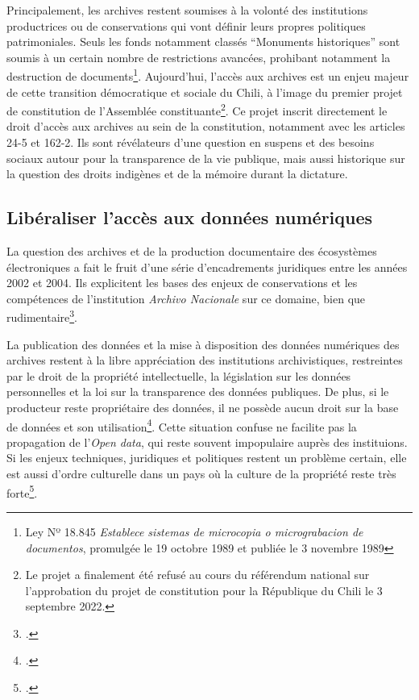 	Principalement, les archives restent soumises à la volonté des institutions productrices ou de conservations  qui vont définir leurs propres politiques patrimoniales. Seuls les fonds notamment classés \enquote{Monuments historiques} sont soumis à un certain nombre de restrictions avancées, prohibant notamment la destruction de documents\footnote{Ley Nº 18.845 \textit{Establece sistemas de microcopia o micrograbacion de documentos}, promulgée le 19 octobre 1989 et publiée le 3 novembre 1989}. Aujourd'hui, l'accès aux archives est un enjeu majeur de cette transition démocratique et sociale du Chili, à l'image du premier projet de constitution de l'Assemblée constituante\footnote{Le projet a finalement été refusé au cours du référendum national sur l'approbation du projet de constitution pour la République du Chili le 3 septembre 2022.}. Ce projet inscrit directement le droit d'accès aux archives au sein de la constitution, notamment avec les articles 24-5 et 162-2. Ils sont révélateurs d'une question en suspens et des besoins sociaux autour pour la transparence de la vie publique, mais aussi historique sur la question des droits indigènes et de la mémoire durant la dictature.
	
	\subsection{Libéraliser l'accès aux données numériques}
	
	La question des archives et de la production documentaire des écosystèmes électroniques a fait le fruit d'une série d'encadrements juridiques entre les années 2002 et 2004. Ils explicitent les bases des enjeux de conservations et les compétences de l'institution \textit{Archivo Nacionale} sur ce domaine, bien que rudimentaire\footcite{acevedoDocumentoElectronicoDerecho2004}. 
	
	La publication des données et la mise à disposition des données numériques des archives restent à la libre appréciation des institutions archivistiques, restreintes par le droit de la propriété intellectuelle, la législation sur les données personnelles et la loi sur la transparence des données publiques. De plus, si le producteur reste propriétaire des données, il ne possède aucun droit sur la base de données et son utilisation\footcite[p.~23]{n.c.ManualDatosAbiertos2014}. Cette situation confuse ne facilite pas la propagation de l'\textit{Open data}, qui reste souvent impopulaire auprès des instituions. Si les enjeux techniques, juridiques et politiques restent un problème certain, elle est aussi d'ordre culturelle dans un pays où la culture de la propriété reste très forte\footcite[p.~43]{n.c.EstadoArteNacional2010}.
	
